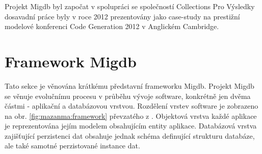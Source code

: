 \documentclass[11pt,twoside,a4paper]{book}
\begin{document}
Projekt Migdb byl započat v spolupráci se společností Collections Pro Výsledky
dosavadní práce byly v roce 2012 prezentovány jako case-study na prestižní
modelové konferenci Code Generation 2012 \cite{Cambridge} v Anglickém Cambridge.

\section{Framework Migdb}
	
Tato sekce je věnována krátkému představní frameworku Migdb. Projekt Migdb se
věnuje evolučnímu procesu v průběhu vývoje software, konkrétně jen dvěma částmi
- aplikační a databázovou vrstvou. Rozdělení vrstev software je zobrazeno na
obr. \ref{fig:mazanma:framework} převzatého z \cite{Mazanec}.
Objektová vrstva každé aplikace je reprezentována jejím modelem obsahujícím
entity aplikace. Databázová vrstva zajišťující perzistenci dat obsahuje jednak
schéma definující strukturu databáze, ale také samotné perzistované instance dat.
\end{document}
